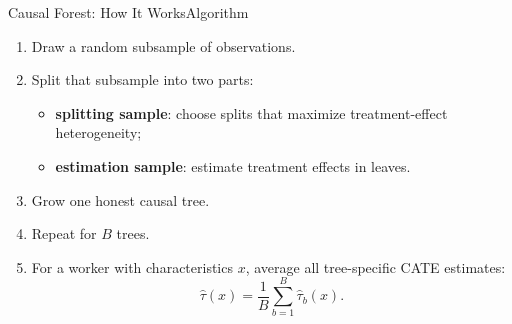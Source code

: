 \documentclass[hyperref={pdfpagelabels=false}]{beamer}
\begin{document}
\begin{frame}{Causal Forest: How It Works}{Algorithm}

\begin{enumerate}
  \item Draw a random subsample of observations.
  \vspace{0.08cm}
  \item Split that subsample into two parts:
  \vspace{0.05cm}
  \begin{itemize}
    \item \textbf{splitting sample}: choose splits that maximize treatment-effect heterogeneity;
    \item \textbf{estimation sample}: estimate treatment effects in leaves.
  \end{itemize}
  \vspace{0.08cm}
  \item Grow one honest causal tree.
  \vspace{0.08cm}
  \item Repeat for $B$ trees.
  \vspace{0.08cm}
  \item For a worker with characteristics $x$, average all tree-specific CATE estimates:
  \[
    \hat{\tau}(x)
    =
    \frac{1}{B}\sum_{b=1}^{B}\hat{\tau}_b(x).
  \]
\end{enumerate}

\end{frame}
\end{document}
